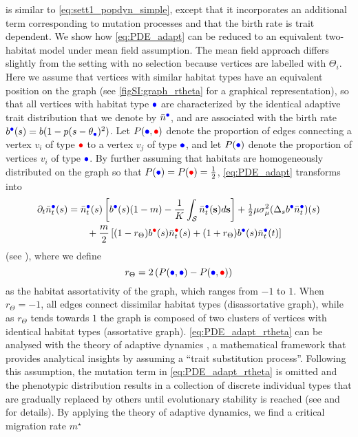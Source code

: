  is similar to \cref{eq:sett1_popdyn_simple}, except that it incorporates an additional term corresponding to mutation processes and that the birth rate is trait dependent.
%
We show how \cref{eq:PDE_adapt} can be reduced to an equivalent two-habitat model under mean field assumption. 
%
The mean field approach differs slightly from the setting with no selection because vertices are labelled with $\Theta_i$. Here we assume that vertices with similar habitat types have an equivalent position on the graph (see \cref{figSI:graph_rtheta} for a graphical representation), so that all vertices with habitat type $\bcirc$ are characterized by the identical adaptive trait distribution that we denote by $\bar{n}^{{\bcirc}}$, and are associated with the birth rate $b^{\bcirc}(s) = b(1 - p(s - \theta_{\bcirc})^2)$. Let $P({\bcirc},{\rcirc})$ denote the proportion of edges connecting a vertex $v_i$ of type $\rcirc$ to a vertex $v_j$ of type $\bcirc$, and let $P(\bcirc)$ denote the proportion of vertices $v_i$ of type $\bcirc$. 
%
By further assuming that habitats are homogeneously distributed on the graph so that $P({\bcirc}) = P({\rcirc}) = \tfrac{1}{2}$, \cref{eq:PDE_adapt} transforms into
\begin{equation}\label{eq:PDE_adapt_rtheta}
  \begin{split}
    \partial_t \bar{n}_t^{{\bcirc}}(s) &= \bar{n}_t^{{\bcirc}}(s)\left[ b^{{\bcirc}}(s) (1-m) - \frac{1}{K}\int_\mathcal{S}  \bar{n}_t^{{\bcirc}}({\textbf s}) d{\textbf s} \right] + \tfrac{1}{2} \mu \sigma_\mu^2 (\Delta_s b^{{\bcirc}} \bar{n}_t^{{\bcirc}})(s) \\
    & \qquad + \frac{m}{2} \, [ (1-r_\Theta)  b^{{\rcirc}}(s) \bar{n}_t^{{\rcirc}}(s) + (1 + r_\Theta)  b^{{\bcirc}}(s) \bar{n}_t^{{\bcirc}}(t)]\\
  \end{split}
\end{equation}
%
(see ), where we define
\begin{equation}\label{eq:r_theta_mf}
  r_\Theta = 2 \left( P({\bcirc},{\bcirc}) - P({\bcirc},{\rcirc}) \right)
\end{equation} 
as the habitat assortativity of the graph, which ranges from $-1$ to $1$.
%
When $r_\Theta = -1$, all edges connect dissimilar habitat types (disassortative graph), while as $r_\Theta$ tends towards $1$ the graph is composed of two clusters of vertices with identical habitat types (assortative graph).
%
\cref{eq:PDE_adapt_rtheta} can be analysed with the theory of adaptive dynamics \citep{Meszena1997,Debarre2013,Mirrahimi2020}, a mathematical framework that provides analytical insights by assuming a “trait substitution process”. Following this assumption, the mutation term in \cref{eq:PDE_adapt_rtheta} is omitted and the phenotypic distribution results in a collection of discrete individual types that are gradually replaced by others until evolutionary stability is reached (see  and \citep{Meszena1997,Debarre2013,Mirrahimi2020} for details). By applying the theory of adaptive dynamics, we find a critical migration rate $m^\star$
